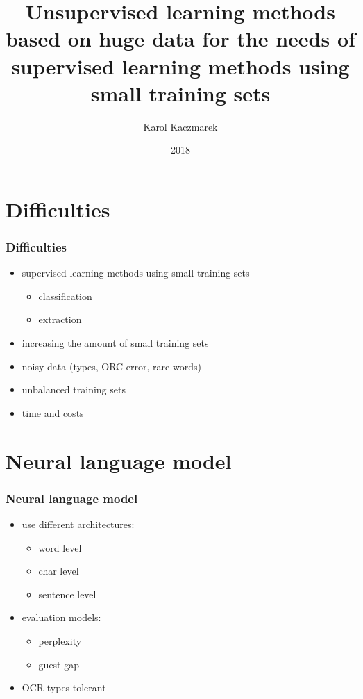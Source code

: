 \documentclass{beamer}
\title{\normalsize{Unsupervised learning methods based on huge data for the needs of supervised learning methods using small training sets}}
\author[{K. Kaczmarek}]{Karol Kaczmarek}
\date{2018}
\begin{document}
\begin{frame}
    \titlepage
\end{frame}



\section{Difficulties}

\begin{frame}
    \frametitle{Difficulties}
    \begin{itemize}
        \item supervised learning methods using small training sets
        \begin{itemize}
            \item classification
            \item extraction
        \end{itemize}
      \item increasing the amount of small training sets
      \item noisy data (types, ORC error, rare words)
      \item unbalanced training sets
      \item time and costs
    \end{itemize}
\end{frame}

\section{Neural language model}

\begin{frame}
    \frametitle{Neural language model}
    \begin{itemize}
        \item use different architectures:
        \begin{itemize}
            \item word level
            \item char level
            \item sentence level
        \end{itemize}
        \item evaluation models:
        \begin{itemize}
            \item perplexity
            \item guest gap
        \end{itemize}
        \item OCR types tolerant
    \end{itemize}
\end{frame}
\end{document}
